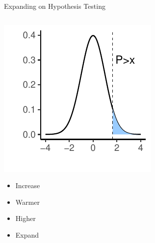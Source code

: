 \documentclass[
  ignorenonframetext,
]{beamer}
\providecommand{\tightlist}{%
  \setlength{\itemsep}{0pt}\setlength{\parskip}{0pt}}
\begin{document}
\begin{frame}{Expanding on Hypothesis Testing}
\begin{columns}[T]
\begin{column}{0.5\textwidth}
\includegraphics{Inferential-Stat-and-Z-test_files/figure-beamer/unnamed-chunk-2-1.pdf}

\centering

\tiny

\begin{itemize}
\tightlist
\item
  Increase
\item
  Warmer
\item
  Higher
\item
  Expand\\
\end{itemize}

\hfill\break
\end{column}
\end{columns}
\end{frame}
\end{document}
